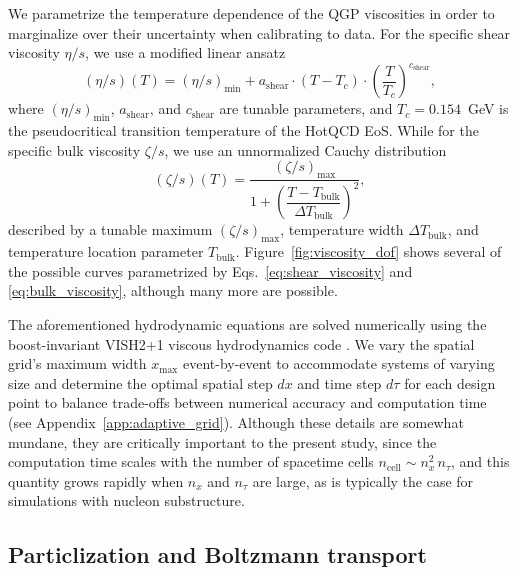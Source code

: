 \documentclass[aps,prc,reprint,amsmath,nofootinbib]{revtex4-1}
\newcommand{\smin}{{(\eta/s)_\mathrm{min}}}
\newcommand{\sslope}{{a_\mathrm{shear}}}
\newcommand{\scrv}{{c_\mathrm{shear}}}
\newcommand{\bmax}{{(\zeta/s)_\mathrm{max}}}
\newcommand{\bloc}{{T_\text{bulk}}}
\newcommand{\bwidth}{{\Delta T_\text{bulk}}}
\begin{document}
We parametrize the temperature dependence of the QGP viscosities in order to marginalize over their uncertainty when calibrating to data.
For the specific shear viscosity $\eta/s$, we use a modified linear ansatz
\begin{equation}
  \label{eq:shear_viscosity}
  (\eta/s)(T) = \smin + \sslope \cdot(T - T_c)\cdot \left ( \frac{T}{T_c} \right)^\scrv,
\end{equation}
where $\smin$, $\sslope$, and $\scrv$ are tunable parameters, and $T_c=0.154$~GeV is the pseudocritical transition temperature of the HotQCD EoS.
While for the specific bulk viscosity $\zeta/s$, we use an unnormalized Cauchy distribution
\begin{equation}
  \label{eq:bulk_viscosity}
  (\zeta/s)(T) = \frac{\bmax}{1 + \left(\dfrac{T - \bloc}{\bwidth}\right)^2},
\end{equation}
described by a tunable maximum $\bmax$, temperature width $\bwidth$, and temperature location parameter $\bloc$.
Figure~\ref{fig:viscosity_dof} shows several of the possible curves parametrized by Eqs.~\eqref{eq:shear_viscosity} and \eqref{eq:bulk_viscosity}, although many more are possible.

The aforementioned hydrodynamic equations are solved numerically using the boost-invariant VISH2+1 viscous hydrodynamics code \cite{Song:2007ux, Shen:2014vra}.
We vary the spatial grid's maximum width $x_\mathrm{max}$ event-by-event to accommodate systems of varying size and determine the optimal spatial step $dx$ and time step $d\tau$ for each design point to balance trade-offs between numerical accuracy and computation time (see Appendix~\ref{app:adaptive_grid}).
Although these details are somewhat mundane, they are critically important to the present study, since the computation time scales with the number of spacetime cells $n_\text{cell} \sim n_x^2\, n_\tau$, and this quantity grows rapidly when $n_x$ and $n_\tau$ are large, as is typically the case for simulations with nucleon substructure.


\subsection{Particlization and Boltzmann transport}
\end{document}
